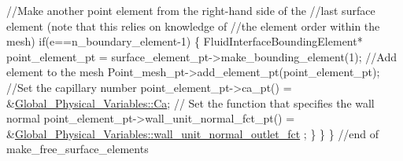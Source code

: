 \begin{DoxyCodeInclude}
     \textcolor{comment}{//Make another point element from the right-hand side of the }
     \textcolor{comment}{//last surface element (note that this relies on knowledge of }
     \textcolor{comment}{//the element order within the mesh)}
     \textcolor{keywordflow}{if}(e==n\_boundary\_element-1)
      \{
       FluidInterfaceBoundingElement* point\_element\_pt =
        surface\_element\_pt->make\_bounding\_element(1);
       \textcolor{comment}{//Add element to the mesh}
       Point\_mesh\_pt->add\_element\_pt(point\_element\_pt);
       \textcolor{comment}{//Set the capillary number}
       point\_element\_pt->ca\_pt() = &\hyperlink{namespaceGlobal__Physical__Variables_a8b32b93d2e546f9375ec418474107838}{Global\_Physical\_Variables::Ca};
       \textcolor{comment}{// Set the function that specifies the wall normal}
       point\_element\_pt->wall\_unit\_normal\_fct\_pt() = 
        &\hyperlink{namespaceGlobal__Physical__Variables_a8ab8f6e823e4cd204ed7264121a42bfb}{Global\_Physical\_Variables::wall\_unit\_normal\_outlet\_fct}
      ;
      \}
    \}
  \} \textcolor{comment}{//end of make\_free\_surface\_elements}

\end{DoxyCodeInclude}


